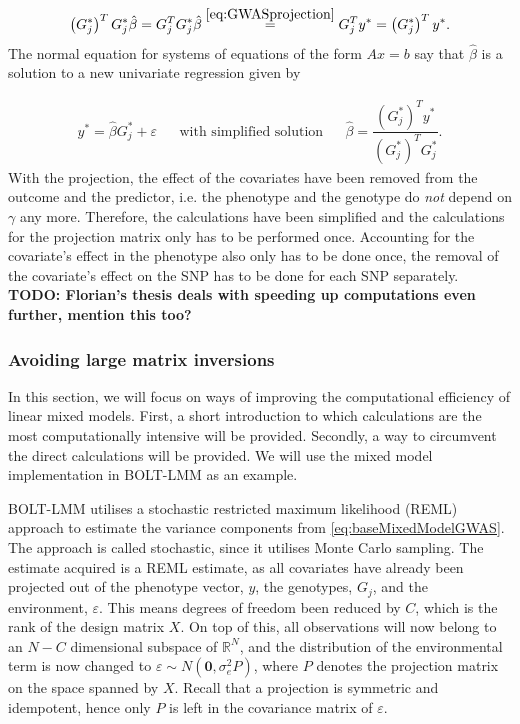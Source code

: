 \begin{equation}
	\left( G_j^{\ast} \right)^T G_j^{\ast} \hat{\beta} = G_j^T G_j^{\ast} \hat{\beta} \stackrel{\ref{eq:GWASprojection}}{=} G_j^T y^{\ast} = \left( G_j^{\ast} \right)^T y^{\ast}.
\end{equation}
The normal equation for systems of equations of the form $ Ax=b $ say that $ \hat{\beta} $ is a solution to a new univariate regression given by

\begin{align}\label{eq:univarGWAS}
	y^\ast = \hat{\beta} G_j^{\ast} + \varepsilon&   &\text{with simplified solution}&  &\hat{\beta} = \dfrac{\left( G_j^{\ast} \right)^T y^{\ast}}{\left( G_j^{\ast} \right)^T G_j^{\ast}}.
\end{align}
With the projection, the effect of the covariates have been removed from the outcome and the predictor, i.e. the phenotype and the genotype do \textit{not} depend on $ \gamma $ any more. Therefore, the calculations have been simplified and the calculations for the projection matrix only has to be performed once. Accounting for the covariate's effect in the phenotype also only has to be done once, the removal of the covariate's effect on the SNP has to be done for each SNP separately.
\textbf{TODO: Florian's thesis deals with speeding up computations even further, mention this too?}


\subsubsection{Avoiding large matrix inversions}

In this section, we will focus on ways of improving the computational efficiency of linear mixed models. First, a short introduction to which calculations are the most computationally intensive will be provided. Secondly, a way to circumvent the direct calculations will be provided. We will use the mixed model implementation in BOLT-LMM as an example.

BOLT-LMM utilises a stochastic restricted maximum likelihood (REML) approach to estimate the variance components from \cref{eq:baseMixedModelGWAS}. The approach is called stochastic, since it utilises Monte Carlo sampling. The estimate acquired is a REML estimate, as all covariates have already been projected out of the phenotype vector, $ y $, the genotypes, $ G_j $, and the environment, $ \varepsilon $. This means degrees of freedom been reduced by $ C $, which is the rank of the design matrix $ X $. On top of this, all observations will now belong to an $ N-C $ dimensional subspace of $ \mathbb{R}^{N} $, and the distribution of the environmental term is now changed to $ \varepsilon \sim N(\mathbf{0}, \sigma_e^2 P)$, where $ P $ denotes the projection matrix on the space spanned by $ X $. Recall that a projection is symmetric and idempotent, hence only $ P $ is left in the covariance matrix of $ \varepsilon $. 

